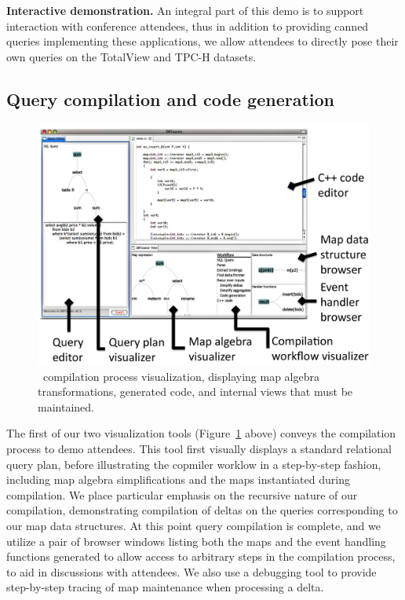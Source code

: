 \smallskip
\noindent\textbf{Interactive demonstration.}
An integral part of this demo is to support interaction with conference
attendees, thus in addition to providing canned queries implementing these
applications, we allow attendees to directly pose their own queries on
the TotalView and TPC-H datasets.



\subsection{Query compilation and code generation}

\begin{figure}[tb]
\begin{center}
\includegraphics[scale=0.088]{figures/dbt-gui}
\end{center}
\caption{\compiler\ compilation process visualization, displaying map algebra
transformations, generated code, and internal views that must be maintained.}
\label{fig:compilegui}
\end{figure}

The first of our two visualization tools (Figure~\ref{fig:compilegui} above)
conveys the compilation process to demo attendees. This tool first visually
displays a standard relational query plan, before illustrating the copmiler
worklow in a step-by-step fashion, including map algebra simplifications and the
maps instantiated during compilation. We place particular emphasis on the
recursive nature of our compilation, demonstrating compilation of deltas on the
queries corresponding to our map data structures. At this point query compilation
is complete, and we utilize a pair of browser windows listing both the maps and
the event handling functions generated to allow access to arbitrary steps in the
compilation process, to aid in discussions with attendees. We also use a
debugging tool to provide step-by-step tracing of map maintenance when
processing a delta.

